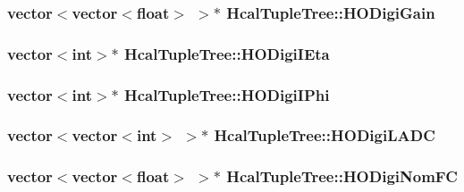 \subsubsection[{H\+O\+Digi\+Gain}]{\setlength{\rightskip}{0pt plus 5cm}vector$<$vector$<$float$>$ $>$$\ast$ Hcal\+Tuple\+Tree\+::\+H\+O\+Digi\+Gain}\label{class_hcal_tuple_tree_ab3d383dc83018d2bc4e468a40af05787}
\hypertarget{class_hcal_tuple_tree_a5f25a69ba6f14ae239054b745cc2f19c}{}
\subsubsection[{H\+O\+Digi\+I\+Eta}]{\setlength{\rightskip}{0pt plus 5cm}vector$<$int$>$$\ast$ Hcal\+Tuple\+Tree\+::\+H\+O\+Digi\+I\+Eta}\label{class_hcal_tuple_tree_a5f25a69ba6f14ae239054b745cc2f19c}
\hypertarget{class_hcal_tuple_tree_a4c609f165405dd9d65e93d84b7b2b08d}{}
\subsubsection[{H\+O\+Digi\+I\+Phi}]{\setlength{\rightskip}{0pt plus 5cm}vector$<$int$>$$\ast$ Hcal\+Tuple\+Tree\+::\+H\+O\+Digi\+I\+Phi}\label{class_hcal_tuple_tree_a4c609f165405dd9d65e93d84b7b2b08d}
\hypertarget{class_hcal_tuple_tree_af5bd84878d749154d56e72a85ea99291}{}
\subsubsection[{H\+O\+Digi\+L\+A\+D\+C}]{\setlength{\rightskip}{0pt plus 5cm}vector$<$vector$<$int$>$ $>$$\ast$ Hcal\+Tuple\+Tree\+::\+H\+O\+Digi\+L\+A\+D\+C}\label{class_hcal_tuple_tree_af5bd84878d749154d56e72a85ea99291}
\hypertarget{class_hcal_tuple_tree_a56ee5bb65a6e34d5b0934fad381f2015}{}
\subsubsection[{H\+O\+Digi\+Nom\+F\+C}]{\setlength{\rightskip}{0pt plus 5cm}vector$<$vector$<$float$>$ $>$$\ast$ Hcal\+Tuple\+Tree\+::\+H\+O\+Digi\+Nom\+F\+C}\label{class_hcal_tuple_tree_a56ee5bb65a6e34d5b0934fad381f2015}
\hypertarget{class_hcal_tuple_tree_af4ae835aebd4b9754cde9868afed4d7d}{}
